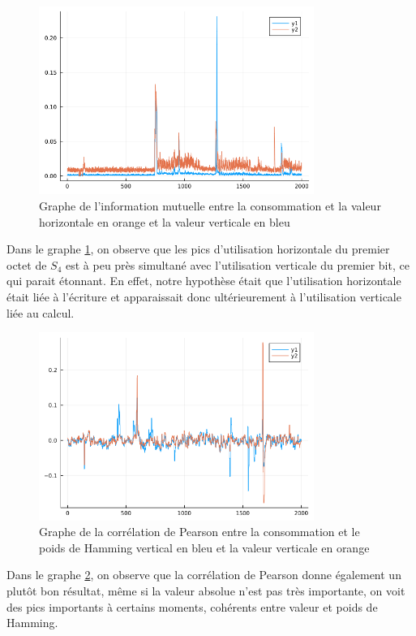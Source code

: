 \documentclass[12pt]{article}
\begin{document}
	\begin{figure}[H]
		\centering
		\includegraphics[width=0.8\textwidth]{h_and_v_one_byte}
		\caption{Graphe de l'information mutuelle entre la consommation et la valeur horizontale en orange et la valeur verticale en bleu}
		\label{hvval}
	\end{figure}
	
	Dans le graphe \ref{hvval}, on observe que les pics d'utilisation horizontale du premier octet de $S_4$ est à peu près simultané avec l'utilisation verticale du premier bit, ce qui parait étonnant. En effet, notre hypothèse était que l'utilisation horizontale était liée à l'écriture et apparaissait donc ultérieurement à l'utilisation verticale liée au calcul.
	
	\begin{figure}[H]
		\centering
		\includegraphics[width=0.8\textwidth]{vertical_corr}
		\caption{Graphe de la corrélation de Pearson entre la consommation et le poids de Hamming vertical en bleu et la valeur verticale en orange}
		\label{vcor}
	\end{figure}
	
	Dans le graphe \ref{vcor}, on observe que la corrélation de Pearson donne également un plutôt bon résultat, même si la valeur absolue n'est pas très importante, on voit des pics importants à certains moments, cohérents entre valeur et poids de Hamming.
	
\end{document}
